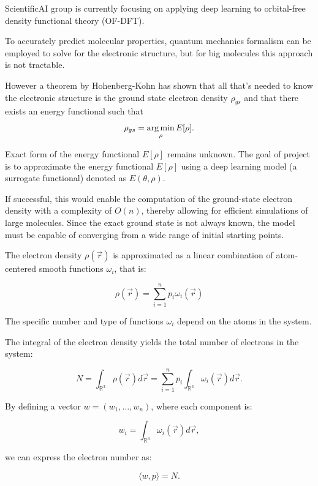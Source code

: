 \documentclass[a4paper,10pt]{report}
\begin{document}

 ScientificAI group is currently focusing on applying deep learning to orbital-free density functional theory (OF-DFT).

 To accurately predict molecular properties, quantum mechanics formalism can be employed to solve for the electronic structure, but for big molecules this approach is not tractable.

However a theorem by Hohenberg-Kohn has shown that all that's needed to know the electronic structure is the ground state electron density $\rho_{gs}$ and that there exists an energy functional such that
\begin{equation*}
 \rho_{gs} = \operatorname*{arg\,min}_\rho E[\rho].
\end{equation*}


Exact form of the energy functional $E[\rho]$ remains unknown. The goal of  project is to approximate the energy functional $E[\rho]$ using a deep learning model (a surrogate functional) denoted as $E(\theta, \rho)$.

If successful, this would enable the computation of the ground-state electron density with a complexity of $O(n)$, thereby allowing for efficient simulations of large molecules. Since the exact ground state is not always known, the model must be capable of converging from a wide range of initial starting points.

The electron density $\rho(\vec{r})$ is approximated as a linear combination of atom-centered smooth functions $\omega_i$, that is:

\[
\rho(\vec{r}) = \sum_{i=1}^n p_i \omega_i(\vec{r})
\]

The specific number and type of functions $\omega_i$ depend on the atoms in the system.

The integral of the electron density yields the total number of electrons in the system:

\[
N = \int_{\mathbb{R}^3} \rho(\vec{r}) d\vec{r} = \sum_{i=1}^n p_i \int_{\mathbb{R}^3} \omega_i(\vec{r}) d\vec{r}.
\]

By defining a vector $w = (w_1, \ldots, w_n)$, where each component is:

\[
w_i = \int_{\mathbb{R}^3} \omega_i(\vec{r}) d\vec{r},
\]

we can express the electron number as:

\[
\langle w, p \rangle = N.
\]
\end{document}

